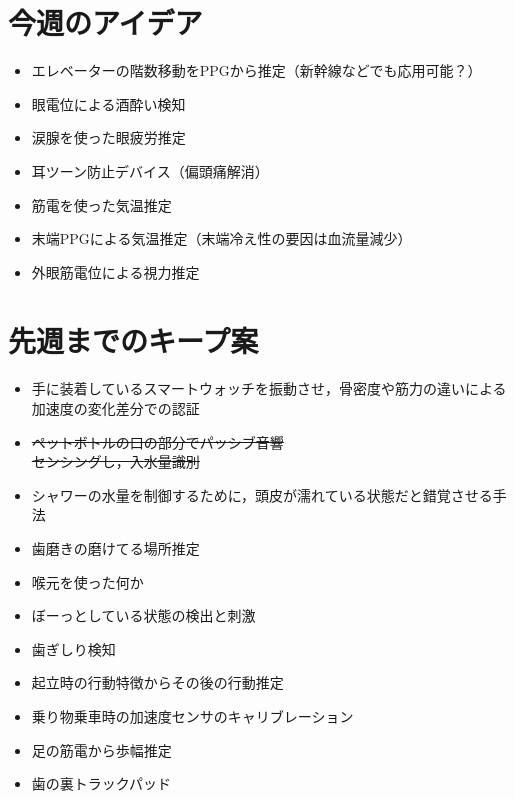 \documentclass[a4j,10pt]{jarticle}
\begin{document}
\begin{multicols}{2}
  \section{今週のアイデア}
  \begin{itemize}
    \item エレベーターの階数移動をPPGから推定（新幹線などでも応用可能？）
    \item 眼電位による酒酔い検知
    \item 涙腺を使った眼疲労推定
    \item 耳ツーン防止デバイス（偏頭痛解消）
    \item 筋電を使った気温推定
    \item 末端PPGによる気温推定（末端冷え性の要因は血流量減少）
    \item 外眼筋電位による視力推定
  \end{itemize}

  \section{先週までのキープ案}
  \begin{itemize}
    \item 手に装着しているスマートウォッチを振動させ，骨密度や筋力の違いによる加速度の変化差分での認証
    \item \sout{ペットボトルの口の部分でパッシブ音響\\センシングし，入水量識別}
    \item シャワーの水量を制御するために，頭皮が濡れている状態だと錯覚させる手法
    \item 歯磨きの磨けてる場所推定
    \item 喉元を使った何か
    \item ぼーっとしている状態の検出と刺激
    \item 歯ぎしり検知
    \item 起立時の行動特徴からその後の行動推定
    \item 乗り物乗車時の加速度センサのキャリブレーション
    \item 足の筋電から歩幅推定
    \item 歯の裏トラックパッド
  \end{itemize}



\end{multicols}
\end{document}
